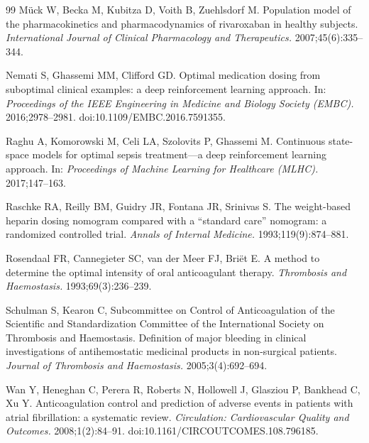 \documentclass[11pt]{article}
\begin{document}
\begin{thebibliography}{99}
M\"uck W, Becka M, Kubitza D, Voith B, Zuehlsdorf M.
Population model of the pharmacokinetics and pharmacodynamics of rivaroxaban in healthy subjects.
\emph{International Journal of Clinical Pharmacology and Therapeutics.} 2007;45(6):335--344.

Nemati S, Ghassemi MM, Clifford GD.
Optimal medication dosing from suboptimal clinical examples: a deep reinforcement learning approach.
In: \emph{Proceedings of the IEEE Engineering in Medicine and Biology Society (EMBC).} 2016;2978--2981. doi:10.1109/EMBC.2016.7591355.

Raghu A, Komorowski M, Celi LA, Szolovits P, Ghassemi M.
Continuous state-space models for optimal sepsis treatment---a deep reinforcement learning approach.
In: \emph{Proceedings of Machine Learning for Healthcare (MLHC).} 2017;147--163.

Raschke RA, Reilly BM, Guidry JR, Fontana JR, Srinivas S.
The weight-based heparin dosing nomogram compared with a ``standard care'' nomogram: a randomized controlled trial.
\emph{Annals of Internal Medicine.} 1993;119(9):874--881.

Rosendaal FR, Cannegieter SC, van der Meer FJ, Bri\"et E.
A method to determine the optimal intensity of oral anticoagulant therapy.
\emph{Thrombosis and Haemostasis.} 1993;69(3):236--239.

Schulman S, Kearon C, Subcommittee on Control of Anticoagulation of the Scientific and Standardization Committee of the International Society on Thrombosis and Haemostasis.
Definition of major bleeding in clinical investigations of antihemostatic medicinal products in non-surgical patients.
\emph{Journal of Thrombosis and Haemostasis.} 2005;3(4):692--694.

Wan Y, Heneghan C, Perera R, Roberts N, Hollowell J, Glasziou P, Bankhead C, Xu Y.
Anticoagulation control and prediction of adverse events in patients with atrial fibrillation: a systematic review.
\emph{Circulation: Cardiovascular Quality and Outcomes.} 2008;1(2):84--91. doi:10.1161/CIRCOUTCOMES.108.796185.

\end{thebibliography}
\end{document}

